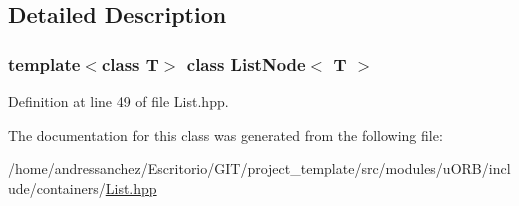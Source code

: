 \subsection{Detailed Description}
\subsubsection*{template$<$class T$>$\newline
class List\+Node$<$ T $>$}



Definition at line 49 of file List.\+hpp.



The documentation for this class was generated from the following file\+:\begin{DoxyCompactItemize}
\item 
/home/andressanchez/\+Escritorio/\+G\+I\+T/project\+\_\+template/src/modules/u\+O\+R\+B/include/containers/\hyperlink{List_8hpp}{List.\+hpp}\end{DoxyCompactItemize}
